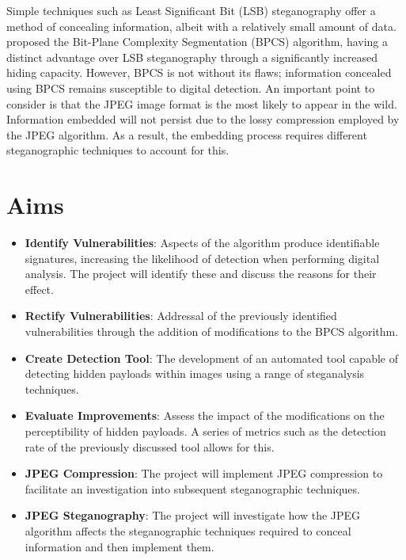 \documentclass{l4proj}
\begin{document}
Simple techniques such as Least Significant Bit (LSB) steganography offer a method of concealing information, albeit with a relatively small amount of data. \citet{Kawaguchi1999PrinciplesAA} proposed the Bit-Plane Complexity Segmentation (BPCS) algorithm, having a distinct advantage over LSB steganography through a significantly increased hiding capacity. However, BPCS is not without its flaws; information concealed using BPCS remains susceptible to digital detection. An important point to consider is that the JPEG image format is the most likely to appear in the wild. Information embedded will not persist due to the lossy compression employed by the JPEG algorithm. As a result, the embedding process requires different steganographic techniques to account for this. 

 
\section{Aims}

\begin{itemize}
    \item \textbf{Identify Vulnerabilities}: Aspects of the algorithm produce identifiable signatures, increasing the likelihood of detection when performing digital analysis. The project will identify these and discuss the reasons for their effect.
    \item \textbf{Rectify Vulnerabilities}:  Addressal of the previously identified vulnerabilities through the addition of modifications to the BPCS algorithm.
    \item \textbf{Create Detection Tool}: The development of an automated tool capable of detecting hidden payloads within images using a range of steganalysis techniques. 
    \item \textbf{Evaluate Improvements}: Assess the impact of the modifications on the perceptibility of hidden payloads. A series of metrics such as the detection rate of the previously discussed tool allows for this. 
    \item \textbf{JPEG Compression}: The project will implement JPEG compression to facilitate an investigation into subsequent steganographic techniques.
    \item \textbf{JPEG Steganography}: The project will investigate how the JPEG algorithm affects the steganographic techniques required to conceal information and then implement them. 
\end{itemize}
\end{document}
